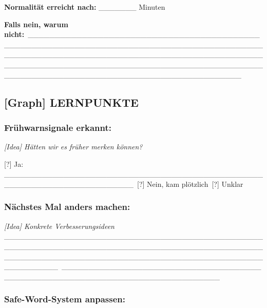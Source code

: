 \textbf{Normalität erreicht nach:} \_\_\_\_\_\_\_ Minuten

\textbf{Falls nein, warum nicht:}\
\_\_\_\_\_\_\_\_\_\_\_\_\_\_\_\_\_\_\_\_\_\_\_\_\_\_\_\_\_\_\_\_\_\_\_\_\_\_\_\_\_\_\_\_\_\_\_\_\_\_\_\_\_\_\_\_\_\_\_\_\_\_\_\_\_\_\_\_\_\_\_\_\_\_\_\_\_\_\_\_\_\_\_\_\_\_\_\_\_\_\_\_\_\_\_\_\_\_\_\_\_\_\_\_\_\_\_\_\_\_\_\_\_\_\_\_\_\_\_\_\_\_\_\_\_\_\_\_\_\_\_\_\_\_\_\_\_\_\_\_\_\_\_\_\_\_\_\_\_\_\_\_\_\_\_\_\_\_\_\_\_\_\_\_\_\_\_\_\_\_\_\_\_\_\_\_\_\_\_\_\_\_\_\_\_\_\_\_\_\_\_\_\_\_\_\_\_\_\_\_\_\_\_\_\_\_\_\_\_\_\_\_\_\_\_\_\_\_\_\_\_\_\_\_\_\_\_\_\_\_\_

\hypertarget{lernpunkte}{%
\subsection{\texorpdfstring{\textbf{[Graph] LERNPUNKTE}}{[Graph] LERNPUNKTE}}\label{lernpunkte}}

\hypertarget{fruxfchwarnsignale-erkannt}{%
\subsubsection{\texorpdfstring{\textbf{Frühwarnsignale erkannt:}}{Frühwarnsignale erkannt:}}\label{fruxfchwarnsignale-erkannt}}

\emph{[Idea] Hätten wir es früher merken können?}

[?] Ja: \_\_\_\_\_\_\_\_\_\_\_\_\_\_\_\_\_\_\_\_\_\_\_\_\_\_\_\_\_\_\_\_\_\_\_\_\_\_\_\_\_\_\_\_\_\_\_\_\_\_\_\_\_\_\_\_\_\_\_\_\_\_\_\_\_\_\_\_\_\_\_\_\
[?] Nein, kam plötzlich\
[?] Unklar

\hypertarget{nuxe4chstes-mal-anders-machen}{%
\subsubsection{\texorpdfstring{\textbf{Nächstes Mal anders machen:}}{Nächstes Mal anders machen:}}\label{nuxe4chstes-mal-anders-machen}}

\emph{[Idea] Konkrete Verbesserungsideen} \_\_\_\_\_\_\_\_\_\_\_\_\_\_\_\_\_\_\_\_\_\_\_\_\_\_\_\_\_\_\_\_\_\_\_\_\_\_\_\_\_\_\_\_\_\_\_\_\_\_\_\_\_\_\_\_\_\_\_\_\_\_\_\_\_\_\_\_\_\_\_\_\_\_\_\_\_\_\_\_\_\_\_\_\_\_\_\_\_\_\_\_\_\_\_\_\_\_\_\_\_\_\_\_\_\_\_\_\_\_\_\_\_\_\_\_\_\_\_\_\_\_\_\_\_\_\_\_\_\_\_\_\_\_\_\_\_\_\_\_\_\_\_\_\_\_\_\_\_\_\_\_\_\_\
\_\_\_\_\_\_\_\_\_\_\_\_\_\_\_\_\_\_\_\_\_\_\_\_\_\_\_\_\_\_\_\_\_\_\_\_\_\_\_\_\_\_\_\_\_\_\_\_\_\_\_\_\_\_\_\_\_\_\_\_\_\_\_\_\_\_\_\_\_\_\_\_\_\_\_\_\_

\hypertarget{safe-word-system-anpassen}{%
\subsubsection{\texorpdfstring{\textbf{Safe-Word-System anpassen:}}{Safe-Word-System anpassen:}}\label{safe-word-system-anpassen}}

